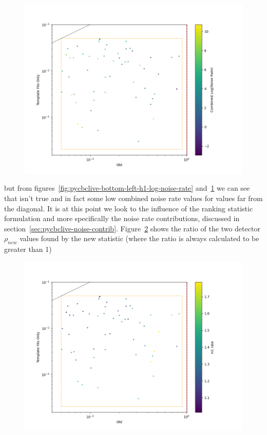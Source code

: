 \begin{figure}
\begin{minipage}[t]{1.0\linewidth}
    \includegraphics[width=1\textwidth]{images/pycbclive/bl_comb_lognoise.png}
    \caption{}
    \label{fig:pycbclive-bottom-left-comb-log-noise-rate}
  
  \end{minipage}
\end{figure}
%
but from figures~\ref{fig:pycbclive-bottom-left-h1-log-noise-rate} and~\ref{fig:pycbclive-bottom-left-comb-log-noise-rate} we can see that isn't true and in fact some low combined noise rate values for values far from the diagonal. It is at this point we look to the influence of the ranking statistic formulation and more specifically the noise rate contributions, discussed in section~\ref{sec:pycbclive-noise-contrib}. Figure~\ref{fig:pycbclive-bottom-left-snr-ratio} shows the ratio of the two detector $\rho_{new}$ values found by the new statistic (where the ratio is always calculated to be greater than 1)
%
\begin{figure}
  \centering
  \begin{minipage}[t]{1.0\linewidth}
  
    \includegraphics[width=1\textwidth]{images/pycbclive/bl_snr_ratio.png}
    \caption{}
    \label{fig:pycbclive-bottom-left-snr-ratio}
  
  \end{minipage}
\end{figure}
